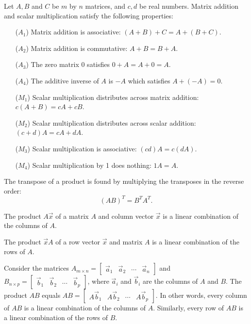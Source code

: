 \begin{theorem} \label{matrix vector space properties}
Let $A,B$ and $C$ be $m$ by $n$ matrices, and $c,d$ be real numbers.  Matrix addition and scalar multiplication satisfy the following properties:
\begin{enumerate}
	\item[($A_1$)] Matrix addition is associative: $(A+B)+C = A +(B+C)$.
	\item[($A_2$)] Matrix addition is commutative: $A+B=B+A$.
	\item[($A_3$)] The zero matrix $0$ satisfies $0+A = A+0=A$.
	\item[($A_4$)] The additive inverse of $A$ is $-A$ which satisfies $A+(-A)=0$.
	\item[($M_1$)] Scalar multiplication distributes across matrix addition: $c(A+B)= cA + cB$.
	\item[($M_2$)] Scalar multiplication distributes across scalar addition: $(c+d)A= cA+ dA$.
	\item[($M_3$)] Scalar multiplication is associative: $(cd)A = c(dA)$.
	\item[($M_4$)] Scalar multiplication by 1 does nothing: $1A=A$.
\end{enumerate}
\end{theorem}

\begin{theorem}
\label{thm transpose of product}
The transpose of a product is found by multiplying the transposes in the reverse order:
$$(AB)^T=B^T A^T.$$
\end{theorem}

\begin{theorem}\label{linearcombcol}
The product $A\vec x$ of a matrix $A$ and column vector $\vec x$ is a linear combination of the columns of $A$. 
\end{theorem}

\begin{theorem}\label{linearcombrow}
The product $\vec x A$ of a row vector $\vec x$ and matrix $A$ is a linear combination of the rows of $A$.
\end{theorem}

\begin{theorem}\label{matrix multiplication two ways}
Consider the matrices $A_{m\times n} = \begin{bmatrix}\vec a_1 & \vec a_2 &\cdots &\vec a_n\end{bmatrix}$ and 
$B_{n\times p} = \begin{bmatrix}\vec b_1 & \vec b_2 &\cdots &\vec b_p\end{bmatrix}$, where $\vec a_i$ and $\vec b_i$ are the columns of $A$ and $B$.  The product $AB$ equals $AB = \begin{bmatrix}A\vec b_1 & A\vec b_2 &\cdots &A\vec b_p\end{bmatrix}$. In other words, every column of $AB$ is a linear combination of the columns of $A$.
Similarly, every row of $AB$ is a linear combination of the rows of $B$.
\end{theorem}



